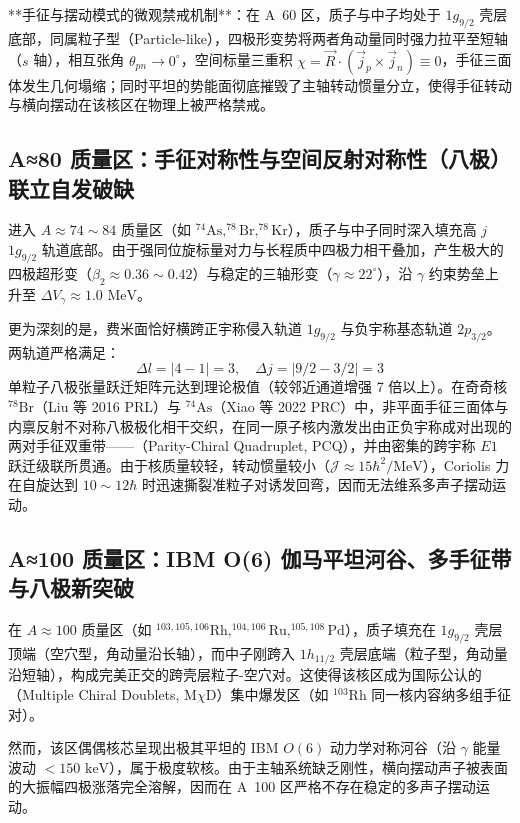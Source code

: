 **手征与摆动模式的微观禁戒机制**：在 A~60 区，质子与中子均处于 $1g_{9/2}$ 壳层底部，同属粒子型（Particle-like），四极形变势将两者角动量同时强力拉平至短轴（$s$ 轴），相互张角 $\theta_{pn} \to 0^\circ$，空间标量三重积 $\chi = \vec{R} \cdot (\vec{j}_p \times \vec{j}_n) \equiv 0$，手征三面体发生几何塌缩；同时平坦的势能面彻底摧毁了主轴转动惯量分立，使得手征转动与横向摆动在该核区在物理上被严格禁戒。

\subsection{A≈80 质量区：手征对称性与空间反射对称性（八极）联立自发破缺}
进入 $A \approx 74 \sim 84$ 质量区（如 $^{74}\text{As}, ^{78}\text{Br}, ^{78}\text{Kr}$），质子与中子同时深入填充高 $j$ $1g_{9/2}$ 轨道底部。由于强同位旋标量对力与长程质中四极力相干叠加，产生极大的四极超形变（$\beta_2 \approx 0.36 \sim 0.42$）与稳定的三轴形变（$\gamma \approx 22^\circ$），沿 $\gamma$ 约束势垒上升至 $\Delta V_\gamma \approx 1.0\text{ MeV}$。

更为深刻的是，费米面恰好横跨正宇称侵入轨道 $1g_{9/2}$ 与负宇称基态轨道 $2p_{3/2}$。两轨道严格满足：
\begin{equation}
    \Delta l = |4 - 1| = 3, \quad \Delta j = |9/2 - 3/2| = 3
\end{equation}
单粒子八极张量跃迁矩阵元达到理论极值（较邻近通道增强 7 倍以上）。在奇奇核 $^{78}\text{Br}$（Liu 等 2016 PRL）与 $^{74}\text{As}$（Xiao 等 2022 PRC）中，非平面手征三面体与内禀反射不对称八极极化相干交织，在同一原子核内激发出由正负宇称成对出现的两对手征双重带——（Parity-Chiral Quadruplet, PCQ），并由密集的跨宇称 $E1$ 跃迁级联所贯通。由于核质量较轻，转动惯量较小（$\mathcal{J} \approx 15\hbar^2/\text{MeV}$），Coriolis 力在自旋达到 $10\sim 12\hbar$ 时迅速撕裂准粒子对诱发回弯，因而无法维系多声子摆动运动。

\subsection{A≈100 质量区：IBM O(6) 伽马平坦河谷、多手征带与八极新突破}
在 $A \approx 100$ 质量区（如 $^{103,105,106}\text{Rh}, ^{104,106}\text{Ru}, ^{105,108}\text{Pd}$），质子填充在 $1g_{9/2}$ 壳层顶端（空穴型，角动量沿长轴），而中子刚跨入 $1h_{11/2}$ 壳层底端（粒子型，角动量沿短轴），构成完美正交的跨壳层粒子-空穴对。这使得该核区成为国际公认的（Multiple Chiral Doublets, M$\chi$D）集中爆发区（如 $^{103}\text{Rh}$ 同一核内容纳多组手征对）。

然而，该区偶偶核芯呈现出极其平坦的 IBM $O(6)$ 动力学对称河谷（沿 $\gamma$ 能量波动 $< 150\text{ keV}$），属于极度软核。由于主轴系统缺乏刚性，横向摆动声子被表面的大振幅四极涨落完全溶解，因而在 A~100 区严格不存在稳定的多声子摆动运动。

